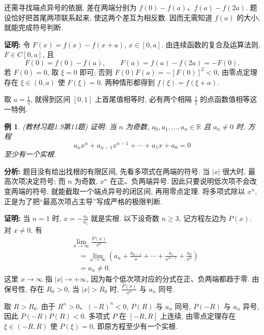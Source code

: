 \documentclass[UTF8,openany]{ctexbook}
\theoremstyle{chinesetextbook}
\newtheorem{example}{例}[section]
\newenvironment{cnproof}{\par\indent\textbf{证明:} \ignorespaces}{\par}
\begin{document}
还需寻找端点异号的依据. 差在两端分别为 $f(0)-f(a)$、$f(a)-f(2a)$. 题设恰好把首尾两项联系起来, 使这两个差互为相反数. 因而无需知道 $f(a)$ 的大小, 就能完成符号判断.
\begin{cnproof}
令 $F(x)=f(x)-f(x+a)$, $x\in[0,a]$. 由连续函数的复合及运算法则, $F\in C[0,a]$, 且
\[
F(0)=f(0)-f(a),\qquad F(a)=f(a)-f(2a)=-F(0).
\]
若 $F(0)=0$, 取 $\xi=0$ 即可; 否则 $F(0)F(a)=-[F(0)]^2<0$, 由零点定理存在 $\xi\in(0,a)$ 使 $F(\xi)=0$. 两种情形都得到 $f(\xi)=f(\xi+a)$.

取 $\displaystyle a=\frac12$, 就得到区间 $[0,1]$ 上首尾值相等时, 必有两个相隔 $\displaystyle\frac12$ 的点函数值相等这一特例.
\end{cnproof}
\begin{example}
(教材习题1.9第11题) 证明: 当 $n$ 为奇数, $a_0,a_1,\ldots,a_n\in\mathbb R$ 且 $a_n\ne0$ 时, 方程
\[
a_nx^n+a_{n-1}x^{n-1}+\cdots+a_1x+a_0=0
\]
至少有一个实根.
\end{example}
\par\indent\textbf{分析:} 题目没有给出找根的有限区间, 先看多项式在两端的符号. 当 $|x|$ 很大时, 最高次项决定符号; 而 $n$ 为奇数, $x^n$ 在正、负两端异号. 因此只要说明低次项不会改变两端的符号, 就能截取一个端点异号的闭区间, 再用零点定理. 将多项式除以 $x^n$, 正是为了把“最高次项占主导”写成严格的极限判断.
\begin{cnproof}
当 $n=1$ 时, $\displaystyle x=-\frac{a_0}{a_1}$ 就是实根. 以下设奇数 $n\ge3$, 记方程左边为 $P(x)$. 对 $x\ne0$, 有
\[
\begin{aligned}
&\lim_{x\to\infty}\frac{P(x)}{x^n}\\
&\quad=\lim_{x\to\infty}\left(a_n+\frac{a_{n-1}}x+\cdots+\frac{a_1}{x^{n-1}}+\frac{a_0}{x^n}\right)\\
&\quad=a_n\ne0.
\end{aligned}
\]
这里 $x\to\infty$ 指 $|x|\to+\infty$, 因为每个低次项对应的分式在正、负两端都趋于零. 由保号性, 存在 $R_0>0$, 当 $|x|>R_0$ 时, $\displaystyle\frac{P(x)}{x^n}$ 与 $a_n$ 同号.

取 $R>R_0$. 由于 $R^n>0$、$(-R)^n<0$, $P(R)$ 与 $a_n$ 同号, $P(-R)$ 与 $a_n$ 异号, 因此 $P(-R)P(R)<0$. 多项式 $P$ 在 $[-R,R]$ 上连续, 由零点定理存在 $\xi\in(-R,R)$ 使 $P(\xi)=0$, 即原方程至少有一个实根.
\end{cnproof}
\end{document}
